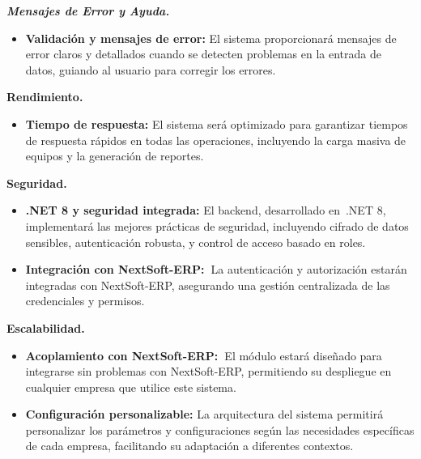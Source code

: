\documentclass[stu, 12pt, letterpaper, donotrepeattitle, floatsintext, natbib]{apa7}
\begin{document}
\textit{\textbf{Mensajes de Error y Ayuda.}}
\begin{itemize}
    \item\textbf{Validación y mensajes de error: }El sistema proporcionará mensajes de error claros y detallados cuando se detecten problemas
          en la entrada de datos, guiando al usuario para corregir los errores.
\end{itemize}

\textbf{Rendimiento.}
\begin{itemize}
    \item\textbf{Tiempo de respuesta: }El sistema será optimizado para garantizar tiempos de respuesta rápidos en todas las operaciones,
          incluyendo la carga masiva de equipos y la generación de reportes.
\end{itemize}

\textbf{Seguridad.}
\begin{itemize}
    \item\textbf{.NET 8 y seguridad integrada: }El backend, desarrollado en~.NET 8, implementará las mejores prácticas de seguridad, incluyendo
          cifrado de datos sensibles, autenticación robusta, y control de acceso basado en roles.
    \item\textbf{Integración con NextSoft-ERP:~}La autenticación y autorización estarán integradas con NextSoft-ERP, asegurando una gestión
          centralizada de las credenciales y permisos.
\end{itemize}

\textbf{Escalabilidad.}
\begin{itemize}
    \item\textbf{Acoplamiento con NextSoft-ERP:~}El módulo estará diseñado para integrarse sin problemas con NextSoft-ERP, permitiendo su
          despliegue en cualquier empresa que utilice este sistema.
    \item\textbf{Configuración personalizable: }La arquitectura del sistema permitirá personalizar los parámetros y configuraciones según las
          necesidades específicas de cada empresa, facilitando su adaptación a diferentes contextos.
\end{itemize}
\end{document}
